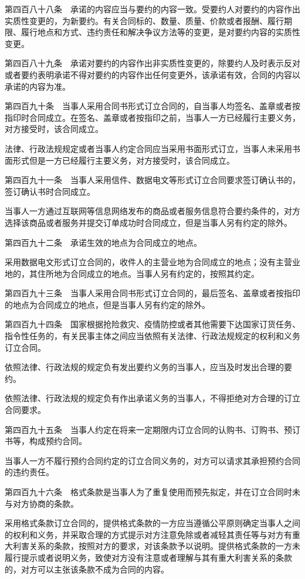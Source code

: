 \documentclass[UTF8,12pt,a4paper]{ctexbook}
\begin{document}
第四百八十八条　承诺的内容应当与要约的内容一致。受要约人对要约的内容作出实质性变更的，为新要约。有关合同标的、数量、质量、价款或者报酬、履行期限、履行地点和方式、违约责任和解决争议方法等的变更，是对要约内容的实质性变更。

第四百八十九条　承诺对要约的内容作出非实质性变更的，除要约人及时表示反对或者要约表明承诺不得对要约的内容作出任何变更外，该承诺有效，合同的内容以承诺的内容为准。

第四百九十条　当事人采用合同书形式订立合同的，自当事人均签名、盖章或者按指印时合同成立。在签名、盖章或者按指印之前，当事人一方已经履行主要义务，对方接受时，该合同成立。

法律、行政法规规定或者当事人约定合同应当采用书面形式订立，当事人未采用书面形式但是一方已经履行主要义务，对方接受时，该合同成立。

第四百九十一条　当事人采用信件、数据电文等形式订立合同要求签订确认书的，签订确认书时合同成立。

当事人一方通过互联网等信息网络发布的商品或者服务信息符合要约条件的，对方选择该商品或者服务并提交订单成功时合同成立，但是当事人另有约定的除外。

第四百九十二条　承诺生效的地点为合同成立的地点。

采用数据电文形式订立合同的，收件人的主营业地为合同成立的地点；没有主营业地的，其住所地为合同成立的地点。当事人另有约定的，按照其约定。

第四百九十三条　当事人采用合同书形式订立合同的，最后签名、盖章或者按指印的地点为合同成立的地点，但是当事人另有约定的除外。

第四百九十四条　国家根据抢险救灾、疫情防控或者其他需要下达国家订货任务、指令性任务的，有关民事主体之间应当依照有关法律、行政法规规定的权利和义务订立合同。

依照法律、行政法规的规定负有发出要约义务的当事人，应当及时发出合理的要约。

依照法律、行政法规的规定负有作出承诺义务的当事人，不得拒绝对方合理的订立合同要求。

第四百九十五条　当事人约定在将来一定期限内订立合同的认购书、订购书、预订书等，构成预约合同。

当事人一方不履行预约合同约定的订立合同义务的，对方可以请求其承担预约合同的违约责任。

第四百九十六条　格式条款是当事人为了重复使用而预先拟定，并在订立合同时未与对方协商的条款。

采用格式条款订立合同的，提供格式条款的一方应当遵循公平原则确定当事人之间的权利和义务，并采取合理的方式提示对方注意免除或者减轻其责任等与对方有重大利害关系的条款，按照对方的要求，对该条款予以说明。提供格式条款的一方未履行提示或者说明义务，致使对方没有注意或者理解与其有重大利害关系的条款的，对方可以主张该条款不成为合同的内容。
\end{document}
